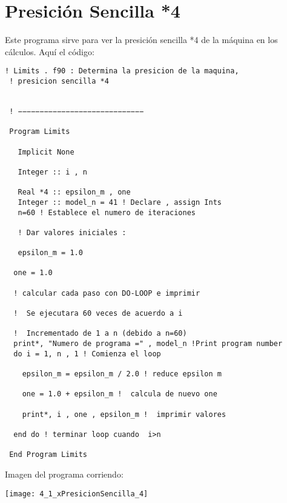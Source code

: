 \documentclass[notitlepage,12pt]{article}
\begin{document}
\section{Presici\'on Sencilla *4}
Este programa sirve para ver la presici\'on sencilla *4
de la m\'aquina en los c\'alculos.
Aqu\'i el c\'odigo:
\begin{verbatim}
! Limits . f90 : Determina la presicion de la maquina, 
 ! presicion sencilla *4


 ! −−−−−−−−−−−−−−−−−−−−−−−−−−−−−

 Program Limits

   Implicit None

   Integer :: i , n

   Real *4 :: epsilon_m , one
   Integer :: model_n = 41 ! Declare , assign Ints
   n=60 ! Establece el numero de iteraciones

   ! Dar valores iniciales :

   epsilon_m = 1.0

  one = 1.0

  ! calcular cada paso con DO-LOOP e imprimir

  !  Se ejecutara 60 veces de acuerdo a i

  !  Incrementado de 1 a n (debido a n=60)
  print*, "Numero de programa =" , model_n !Print program number
  do i = 1, n , 1 ! Comienza el loop

    epsilon_m = epsilon_m / 2.0 ! reduce epsilon m

    one = 1.0 + epsilon_m !  calcula de nuevo one

    print*, i , one , epsilon_m !  imprimir valores

  end do ! terminar loop cuando  i>n

 End Program Limits 
\end{verbatim}
Imagen del programa corriendo:

\texttt{[image: 4\_1\_xPresicionSencilla\_4]}
\end{document}

